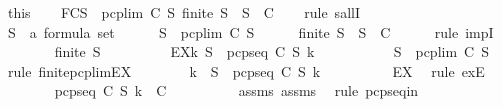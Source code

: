 \begin{isabellebody}
\ this\isanewline
\ \ \isamarkupfalse%
\ FC{}{\isacharcolon}{\isachardoublequoteopen}{\isasymforall}S{\isacharprime}\ {\isasymsubseteq}\ pcp{\isacharunderscore}lim\ C\ S{\isachardot}\ finite\ S{\isacharprime}\ {\isasymlongrightarrow}\ S{\isacharprime}\ {\isasymin}\ C{\isachardoublequoteclose}\isanewline
\ \ \isamarkupfalse%
\ {\isacharparenleft}rule\ sallI{\isacharparenright}\isanewline
\ \ \ \ \isamarkupfalse%
\ S{\isacharprime}\ {\isacharcolon}{\isacharcolon}\ {\isachardoublequoteopen}{\isacharprime}a\ formula\ set{\isachardoublequoteclose}\isanewline
\ \ \ \ \isamarkupfalse%
\ {\isachardoublequoteopen}S{\isacharprime}\ {\isasymsubseteq}\ pcp{\isacharunderscore}lim\ C\ S{\isachardoublequoteclose}\isanewline
\ \ \ \ \isamarkupfalse%
\ {\isachardoublequoteopen}finite\ S{\isacharprime}\ {\isasymlongrightarrow}\ S{\isacharprime}\ {\isasymin}\ C{\isachardoublequoteclose}\isanewline
\ \ \ \ \isamarkupfalse%
\ {\isacharparenleft}rule\ impI{\isacharparenright}\isanewline
\ \ \ \ \ \ \isamarkupfalse%
\ {\isachardoublequoteopen}finite\ S{\isacharprime}{\isachardoublequoteclose}\isanewline
\ \ \ \ \ \ \isamarkupfalse%
\ \isamarkupfalse%
\ EX{\isacharcolon}{\isachardoublequoteopen}{\isasymexists}k{\isachardot}\ S{\isacharprime}\ {\isasymsubseteq}\ pcp{\isacharunderscore}seq\ C\ S\ k{\isachardoublequoteclose}\ \isanewline
\ \ \ \ \ \ \ \ \isamarkupfalse%
\ {\isacartoucheopen}S{\isacharprime}\ {\isasymsubseteq}\ pcp{\isacharunderscore}lim\ C\ S{\isacartoucheclose}\ \isamarkupfalse%
\ {\isacharparenleft}rule\ finite{\isacharunderscore}pcp{\isacharunderscore}lim{\isacharunderscore}EX{\isacharparenright}\isanewline
\ \ \ \ \ \ \isamarkupfalse%
\ k\ \ {\isachardoublequoteopen}S{\isacharprime}\ {\isasymsubseteq}\ pcp{\isacharunderscore}seq\ C\ S\ k{\isachardoublequoteclose}\isanewline
\ \ \ \ \ \ \ \ \isamarkupfalse%
\ EX\ \isamarkupfalse%
\ {\isacharparenleft}rule\ exE{\isacharparenright}\isanewline
\ \ \ \ \ \ \isamarkupfalse%
\ {\isachardoublequoteopen}pcp{\isacharunderscore}seq\ C\ S\ k\ {\isasymin}\ C{\isachardoublequoteclose}\isanewline
\ \ \ \ \ \ \ \ \isamarkupfalse%
\ assms{\isacharparenleft}{}{\isacharparenright}\ assms{\isacharparenleft}{}{\isacharparenright}\ \isamarkupfalse%
\ {\isacharparenleft}rule\ pcp{\isacharunderscore}seq{\isacharunderscore}in{\isacharparenright}\isanewline

\end{isabellebody}
